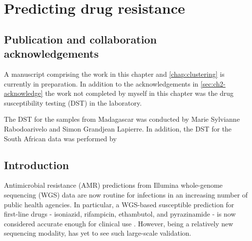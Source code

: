 \chapter{Predicting \mtb{} drug resistance}
\label{chap:dst}
\ifpdf
    \graphicspath{{Chapter3/Figs/Raster/}{Chapter3/Figs/PDF/}{Chapter3/Figs/}}
\else
    \graphicspath{{Chapter3/Figs/Vector/}{Chapter3/Figs/}}
\fi


\setcounter{section}{-1}
\section{Publication and collaboration acknowledgements}
\label{sec:ch3-acknowledge}

A manuscript comprising the work in this chapter and \autoref{chap:clustering} is currently in preparation. In addition to the acknowledgements in \autoref{sec:ch2-acknowledge} the work not completed by myself in this chapter was the drug susceptibility testing (DST) in the laboratory.

The DST for the samples from Madagascar was conducted by Marie Sylvianne Rabodoarivelo and Simon Grandjean Lapierre. In addition, the DST for the South African data was performed by 

\section{Introduction}
Antimicrobial resistance (AMR) predictions from Illumina whole-genome sequencing (WGS) data are now routine for \mtb{} infections in an increasing number of public health agencies. In particular, a WGS-based susceptible prediction for first-line drugs - isoniazid, rifampicin, ethambutol, and pyrazinamide - is now considered accurate enough for clinical use \cite{cryptic2018}. However, being a relatively new sequencing modality, \ont{} has yet to see such large-scale validation.

